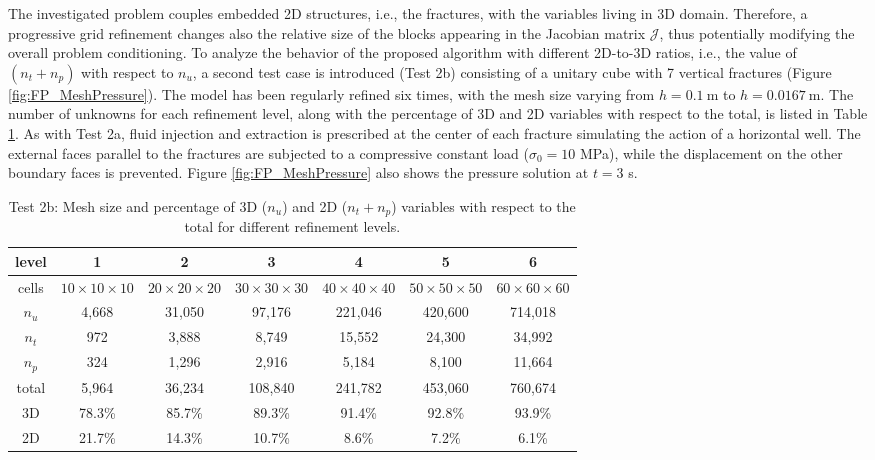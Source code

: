 \documentclass[3p,times]{elsarticle}
\theoremstyle{plain}
\begin{document}
The investigated problem couples embedded 2D structures, i.e., the fractures, with the variables living in 3D domain. Therefore, a progressive grid refinement changes also the relative size of the blocks appearing in the Jacobian matrix $\mathcal{J}$, thus potentially modifying the overall problem conditioning. 
To analyze the behavior of the proposed algorithm with different 2D-to-3D ratios, i.e., the value of $(n_t+n_p)$ with respect to $n_u$, a second test case is introduced (Test 2b) consisting of a unitary cube with 7 vertical fractures (Figure \ref{fig:FP_MeshPressure}). The model has been regularly refined six times, with the mesh size varying from $h = 0.1 \ \text{m}$ to $h = 0.0167 \ \text{m}$. The number of unknowns for each refinement level, along with the percentage of 3D and 2D variables with respect to the total, is listed in Table \ref{tab:sizes}.
As with Test 2a, %
fluid injection and extraction is prescribed at the center of each fracture simulating the action of a horizontal well. The external faces parallel to the fractures are subjected to
a compressive constant load ($\sigma_0 = 10$ MPa), while the displacement on the other boundary faces is prevented. %
Figure \ref{fig:FP_MeshPressure} also shows the pressure solution at $t=3$ s.

\begin{table}%
  \centering
  \begin{tabular}{c|c|c|c|c|c|c}
    level &   1 &      2 &      3 &      4 &      5 &      6 \\
    \hline
    cells & $10\times10\times10$ & $20\times20\times20$ &  $30\times30\times30$ &    $40\times40\times40$ &  $50\times50\times50$ & $60\times60\times60$ \\
    \hline
    $n_u$ &   4,668 &  31,050 &  97,176 & 221,046 & 420,600 & 714,018 \\
    $n_t$ &    972 &   3,888 &   8,749 &  15,552 &  24,300 &  34,992 \\
    $n_p$ &    324 &   1,296 &   2,916 &   5,184 &   8,100 &  11,664 \\
    \hline
    total &   5,964 &  36,234 & 108,840 & 241,782 & 453,060 & 760,674 \\
    \hline
    3D & 78.3\% & 85.7\% & 89.3\% & 91.4\% & 92.8\% & 93.9\% \\
    2D & 21.7\% & 14.3\% & 10.7\% &  8.6\% &  7.2\% &  6.1\% \\
  \end{tabular}
  \caption{Test 2b: Mesh size and percentage of 3D ($n_u$) and 2D ($n_t+n_p$) variables with respect to the total for different refinement levels.}
  \label{tab:sizes}
\end{table}
\end{document}
